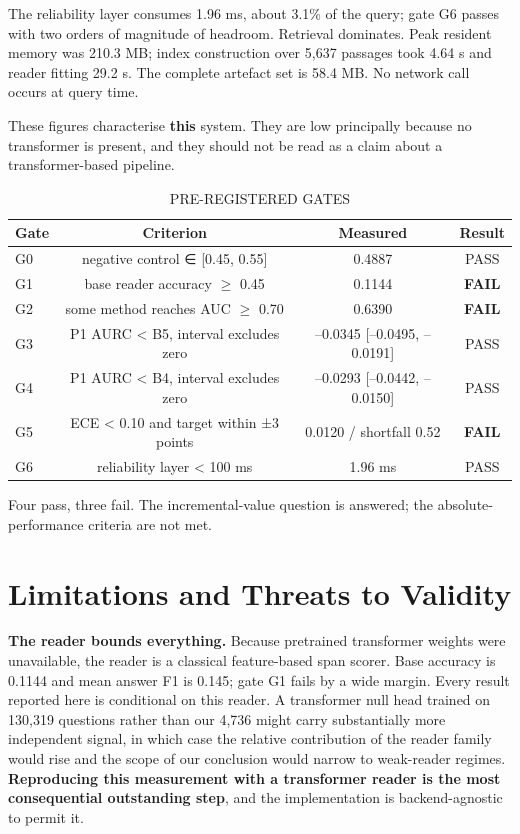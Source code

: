 \documentclass[conference]{IEEEtran}
\begin{document}
The reliability layer consumes 1.96 ms, about 3.1\% of the query; gate G6 passes with two orders of magnitude of headroom. Retrieval dominates. Peak resident memory was 210.3 MB; index construction over 5,637 passages took 4.64 s and reader fitting 29.2 s. The complete artefact set is 58.4 MB. No network call occurs at query time.

These figures characterise \textbf{this} system. They are low principally because no transformer is present, and they should not be read as a claim about a transformer-based pipeline.

\begin{table}[t]\centering\caption{PRE-REGISTERED GATES}\label{tab:10}\footnotesize
\begin{tabular}{lccc}\hline
\textbf{Gate} & \textbf{Criterion} & \textbf{Measured} & \textbf{Result} \\ \hline
G0 & negative control ∈ [0.45, 0.55] & 0.4887 & PASS \\
G1 & base reader accuracy $\geq$ 0.45 & 0.1144 & \textbf{FAIL} \\
G2 & some method reaches AUC $\geq$ 0.70 & 0.6390 & \textbf{FAIL} \\
G3 & P1 AURC < B5, interval excludes zero & --0.0345 [--0.0495, --0.0191] & PASS \\
G4 & P1 AURC < B4, interval excludes zero & --0.0293 [--0.0442, --0.0150] & PASS \\
G5 & ECE < 0.10 and target within ±3 points & 0.0120 / shortfall 0.52 & \textbf{FAIL} \\
G6 & reliability layer < 100 ms & 1.96 ms & PASS \\
\hline\end{tabular}\end{table}

Four pass, three fail. The incremental-value question is answered; the absolute-performance criteria are not met.

\section{Limitations and Threats to Validity}

\textbf{The reader bounds everything.} Because pretrained transformer weights were unavailable, the reader is a classical feature-based span scorer. Base accuracy is 0.1144 and mean answer F1 is 0.145; gate G1 fails by a wide margin. Every result reported here is conditional on this reader. A transformer null head trained on 130,319 questions rather than our 4,736 might carry substantially more independent signal, in which case the relative contribution of the reader family would rise and the scope of our conclusion would narrow to weak-reader regimes. \textbf{Reproducing this measurement with a transformer reader is the most consequential outstanding step}, and the implementation is backend-agnostic to permit it.
\end{document}
